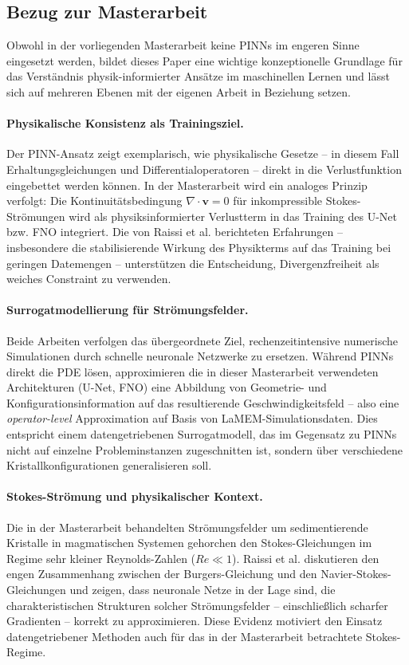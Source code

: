\documentclass[a4paper,12pt]{article}
\begin{document}
\subsection*{Bezug zur Masterarbeit}

Obwohl in der vorliegenden Masterarbeit keine PINNs im engeren Sinne eingesetzt werden, bildet dieses Paper eine wichtige konzeptionelle Grundlage für das Verständnis physik-informierter Ansätze im maschinellen Lernen und lässt sich auf mehreren Ebenen mit der eigenen Arbeit in Beziehung setzen.

\paragraph{Physikalische Konsistenz als Trainingsziel.}
Der PINN-Ansatz zeigt exemplarisch, wie physikalische Gesetze -- in diesem Fall Erhaltungsgleichungen und Differentialoperatoren -- direkt in die Verlustfunktion eingebettet werden können. In der Masterarbeit wird ein analoges Prinzip verfolgt: Die Kontinuitätsbedingung $\nabla \cdot \mathbf{v} = 0$ für inkompressible Stokes-Strömungen wird als physiksinformierter Verlustterm in das Training des U-Net bzw. FNO integriert. Die von Raissi et al. berichteten Erfahrungen -- insbesondere die stabilisierende Wirkung des Physikterms auf das Training bei geringen Datemengen -- unterstützen die Entscheidung, Divergenzfreiheit als weiches Constraint zu verwenden.

\paragraph{Surrogatmodellierung für Strömungsfelder.}
Beide Arbeiten verfolgen das übergeordnete Ziel, rechenzeitintensive numerische Simulationen durch schnelle neuronale Netzwerke zu ersetzen. Während PINNs direkt die PDE lösen, approximieren die in dieser Masterarbeit verwendeten Architekturen (U-Net, FNO) eine Abbildung von Geometrie- und Konfigurationsinformation auf das resultierende Geschwindigkeitsfeld -- also eine \textit{operator-level} Approximation auf Basis von LaMEM-Simulationsdaten. Dies entspricht einem datengetriebenen Surrogatmodell, das im Gegensatz zu PINNs nicht auf einzelne Probleminstanzen zugeschnitten ist, sondern über verschiedene Kristallkonfigurationen generalisieren soll.

\paragraph{Stokes-Strömung und physikalischer Kontext.}
Die in der Masterarbeit behandelten Strömungsfelder um sedimentierende Kristalle in magmatischen Systemen gehorchen den Stokes-Gleichungen im Regime sehr kleiner Reynolds-Zahlen ($Re \ll 1$). Raissi et al. diskutieren den engen Zusammenhang zwischen der Burgers-Gleichung und den Navier-Stokes-Gleichungen und zeigen, dass neuronale Netze in der Lage sind, die charakteristischen Strukturen solcher Strömungsfelder -- einschließlich scharfer Gradienten -- korrekt zu approximieren. Diese Evidenz motiviert den Einsatz datengetriebener Methoden auch für das in der Masterarbeit betrachtete Stokes-Regime.
\end{document}
